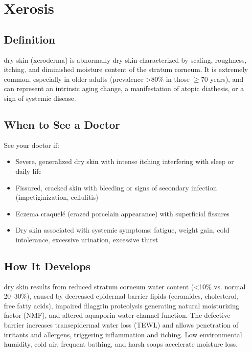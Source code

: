 \chapter{Xerosis}

\section*{Definition}
dry skin (xeroderma) is abnormally dry skin characterized by scaling, roughness, itching, and diminished moisture content of the stratum corneum. It is extremely common, especially in older adults (prevalence >80\% in those \ensuremath{\geq}70 years), and can represent an intrinsic aging change, a manifestation of atopic diathesis, or a sign of systemic disease.

\section*{When to See a Doctor}
See your doctor if:
\begin{itemize}
  \item Severe, generalized dry skin with intense itching interfering with sleep or daily life
  \item Fissured, cracked skin with bleeding or signs of secondary infection (impetiginization, cellulitis)
  \item Eczema craquel\'e (crazed porcelain appearance) with superficial fissures
  \item Dry skin associated with systemic symptoms: fatigue, weight gain, cold intolerance, excessive urination, excessive thirst
\end{itemize}

\section*{How It Develops}
dry skin results from reduced stratum corneum water content (<10\% vs. normal 20--30\%), caused by decreased epidermal barrier lipids (ceramides, cholesterol, free fatty acids), impaired filaggrin proteolysis generating natural moisturizing factor (NMF), and altered aquaporin water channel function. The defective barrier increases transepidermal water loss (TEWL) and allows penetration of irritants and allergens, triggering inflammation and itching. Low environmental humidity, cold air, frequent bathing, and harsh soaps accelerate moisture loss.

